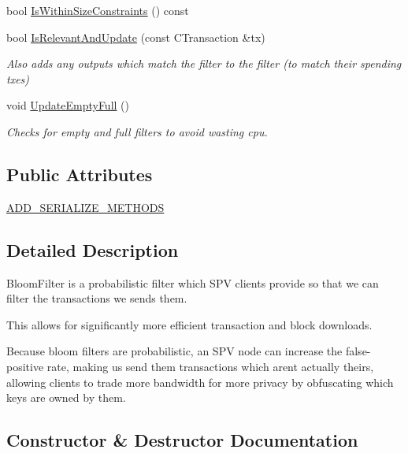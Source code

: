 \begin{DoxyCompactItemize}
bool \hyperlink{class_c_bloom_filter_a9f206ba4f552b62d4a0cd9a1bbe3b48c}{Is\+Within\+Size\+Constraints} () const 
\item 
bool \hyperlink{class_c_bloom_filter_aec420a9b66ab133090c2b4b8ed286f79}{Is\+Relevant\+And\+Update} (const C\+Transaction \&tx)
\begin{DoxyCompactList}\small\item\em Also adds any outputs which match the filter to the filter (to match their spending txes) \end{DoxyCompactList}\item 
void \hyperlink{class_c_bloom_filter_af98b43e91c82a1e4afc7454e8c5672c2}{Update\+Empty\+Full} ()
\begin{DoxyCompactList}\small\item\em Checks for empty and full filters to avoid wasting cpu. \end{DoxyCompactList}\end{DoxyCompactItemize}
\subsection*{Public Attributes}
\begin{DoxyCompactItemize}
\item 
\hyperlink{class_c_bloom_filter_aac1b6a065059e07177ec836929190ad0}{A\+D\+D\+\_\+\+S\+E\+R\+I\+A\+L\+I\+Z\+E\+\_\+\+M\+E\+T\+H\+O\+D\+S}
\end{DoxyCompactItemize}


\subsection{Detailed Description}
Bloom\+Filter is a probabilistic filter which S\+P\+V clients provide so that we can filter the transactions we sends them.

This allows for significantly more efficient transaction and block downloads.

Because bloom filters are probabilistic, an S\+P\+V node can increase the false-\/ positive rate, making us send them transactions which aren\textquotesingle{}t actually theirs, allowing clients to trade more bandwidth for more privacy by obfuscating which keys are owned by them. 

\subsection{Constructor \& Destructor Documentation}
\hypertarget{class_c_bloom_filter_a6395cfcb278ed9cf4ae873549c996f83}{}
